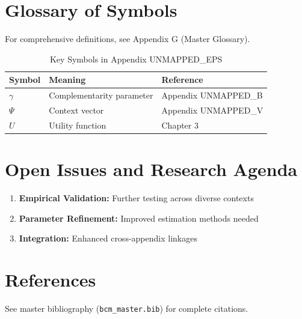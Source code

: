\section{Glossary of Symbols}
\label{sec:eps-glossary}

For comprehensive definitions, see Appendix G (Master Glossary).

\begin{table}[htbp]
\centering
\caption{Key Symbols in Appendix UNMAPPED_EPS}
\begin{tabular}{lll}
\toprule
\textbf{Symbol} & \textbf{Meaning} & \textbf{Reference} \\
\midrule
$\gamma$ & Complementarity parameter & Appendix UNMAPPED_B \\
$\Psi$ & Context vector & Appendix UNMAPPED_V \\
$U$ & Utility function & Chapter 3 \\
\bottomrule
\end{tabular}
\end{table}



\section{Open Issues and Research Agenda}
\label{sec:eps-open}

\begin{enumerate}
    \item \textbf{Empirical Validation:} Further testing across diverse contexts
    \item \textbf{Parameter Refinement:} Improved estimation methods needed
    \item \textbf{Integration:} Enhanced cross-appendix linkages
\end{enumerate}

\section{References}
\label{sec:eps-references}

See master bibliography (\texttt{bcm\_master.bib}) for complete citations.

\nocite{bcm_master}




